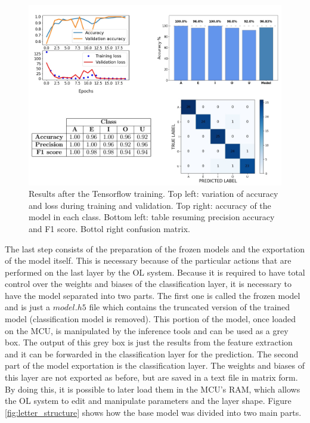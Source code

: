 \documentclass[12pt]{report}
\begin{document}
\begin{figure}[h!]
    \centering
    \includegraphics[width=130mm]{Figures/Chapter4/training_letters.png} 
    \caption{Results after the Tensorflow training. Top left: variation of accuracy and loss during training and validation. Top right: accuracy of the model in each class. Bottom left: table resuming precision accuracy and F1 score. Bottol right confusion matrix.}
    \label{fig:training_letters}    
\end{figure}

The last step consists of the preparation of the frozen models and the exportation of the model itself. This is necessary because of the particular actions that are performed on the last layer by the OL system. Because it is required to have total control over the weights and biases of the classification layer, it is necessary to have the model separated into two parts. The first one is called the frozen model and is just a $model.h5$ file which contains the truncated version of the trained model (classification model is removed). This portion of the model, once loaded on the MCU, is manipulated by the inference tools and can be used as a grey box. The output of this grey box is just the results from the feature extraction and it can be forwarded in the classification layer for the prediction.
The second part of the model exportation is the classification layer. The weights and biases of this layer are not exported as before, but are saved in a text file in matrix form. By doing this, it is possible to later load them in the MCU's RAM, which allows the OL system to edit and manipulate parameters and the layer shape. 
Figure \ref{fig:letter_structure} shows how the base model was divided into two main parts.
\end{document}

